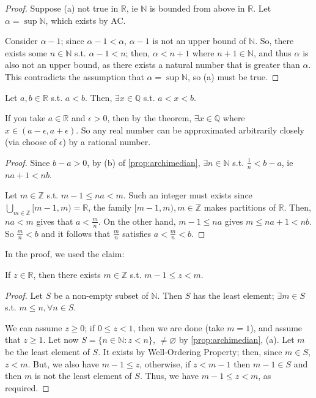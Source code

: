 \documentclass[12pt]{article}
\begin{document}
\begin{proof}
   Suppose (a) not true in $\mathbb{R}$, ie $\mathbb{N}$ is bounded from above in $\mathbb{R}$. Let $\alpha = \sup \mathbb{N}$, which exists by AC.

   Consider $\alpha - 1$; since $\alpha - 1 < \alpha$, $\alpha - 1$ is not an upper bound of $\mathbb{N}$. So, there exists some $n \in \mathbb{N}$ s.t. $\alpha - 1 < n$; then, $\alpha < n+ 1$ where $n+1 \in \mathbb{N}$, and thus $\alpha$ is also not an upper bound, as there exists a natural number that is greater than $\alpha$. This contradicts the assumption that $\alpha = \sup \mathbb{N}$, so (a) must be true.
\end{proof}

\begin{theorem}[Density]
  Let $a,b \in \mathbb{R}$ s.t. $a < b$. Then, $\exists x \in \mathbb{Q}$ s.t. $a < x < b$.
\end{theorem}

\begin{remark}
  If you take $a \in \mathbb{R}$ and $\epsilon > 0$, then by the theorem, $\exists x \in \mathbb{Q}$ where $x \in (a - \epsilon, a + \epsilon)$. So any real number can be approximated arbitrarily closely (via choose of $\epsilon$) by a rational number.
\end{remark}

\begin{proof}
  Since $b - a > 0$, by (b) of \cref{prop:archimedian}, $\exists n \in \mathbb{N}$ s.t. $\frac{1}{n} < b -a$, ie $na + 1 < nb$.

  Let $m \in \mathbb{Z}$ s.t. $m - 1 \leq na < m$. Such an integer must exists since $\bigcup_{m \in \mathbb{Z}} [m-1, m) = \mathbb{R}$, the family $[m-1,m), m \in \mathbb{Z}$ makes partitions of $\mathbb{R}$. Then, $na < m$ gives that $a < \frac{m}{n}$. On the other hand, $m -1 \leq na$ gives $m \leq na+1 < nb$. So $\frac{m}{n} < b$ and it follows that $\frac{m}{n}$ satisfies $a < \frac{m}{n} < b$.
\end{proof}

In the proof, we used the claim:

\begin{proposition}
  If $z \in \mathbb{R}$, then there exists $m \in \mathbb{Z}$ s.t. $m - 1 \leq z < m$.
\end{proposition}

\begin{proof}
  Let $S$ be a non-empty subset of $\mathbb{N}$. Then $S$ has the least element; $\exists m \in S$ s.t. $m \leq n, \forall n \in S$.

  We can assume $z \geq 0$; if $0 \leq z < 1$, then we are done (take $m = 1$), and assume that $z \geq 1$. Let now $S = \{n \in \mathbb{N} : z < n\}$, $\neq \varnothing$ by \cref{prop:archimedian}, (a). Let $m$ be the least element of $S$. It exists by Well-Ordering Property; then, since $m \in S$, $z < m$. But, we also have $m - 1 \leq z$, otherwise, if $z < m-1$ then $m - 1 \in S$ and then $m$ is not the least element of $S$. Thus, we have $m -1 \leq z < m$, as required.
\end{proof}
\end{document}
